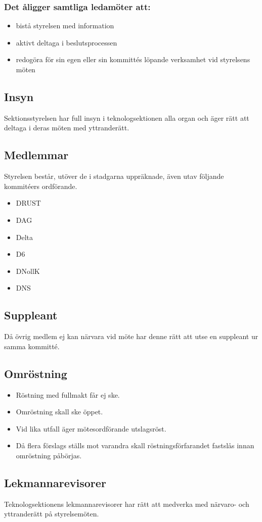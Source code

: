 \subsubsection{Det åligger samtliga ledamöter att:}

\begin{itemize}
  \item bistå styrelsen med information 
  \item aktivt deltaga i beslutsprocessen 
  \item redogöra för sin egen eller sin kommittés löpande verksamhet vid styrelsens möten 
\end{itemize}

\subsection{Insyn} 

Sektionsstyrelsen har full insyn i teknologsektionen alla organ och äger rätt att deltaga i deras möten med yttranderätt. 

\subsection{Medlemmar} 
Styrelsen består, utöver de i stadgarna uppräknade, även utav följande kommitéers ordförande. 
\begin{itemize}
  \item DRUST 
  \item DAG 
  \item Delta 
  \item D6 
  \item DNollK
  \item DNS
\end{itemize}

\subsection{Suppleant} 

Då övrig medlem ej kan närvara vid möte har denne rätt att utse en suppleant ur samma kommitté. 
\subsection{Omröstning} 

\begin{itemize}
  \item Röstning med fullmakt får ej ske. 
  \item Omröstning skall ske öppet. 
  \item Vid lika utfall äger mötesordförande utslagsröst. 
  \item Då flera förslags ställs mot varandra skall röstningsförfarandet fastslås innan omröstning påbörjas.
\end{itemize}

\subsection{Lekmannarevisorer}
Teknologsektionens lekmannarevisorer har rätt att medverka med närvaro-
och yttranderätt på styrelsemöten.
\newpage

